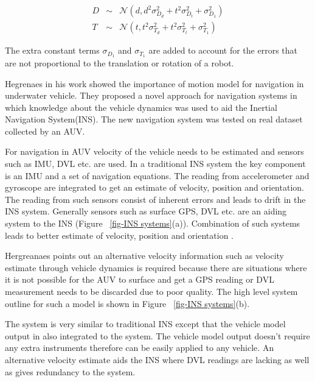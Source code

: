 \documentclass[12pt]{dalcsthesis}
\begin{document}
\begin{equation}
\label{eq-:noise_model_yapp}
\begin{aligned}
D &\sim& \mathcal{{N}}(d,d^2\sigma_{D_{d}}^2+t^2\sigma_{D_{t}}^2+\sigma_{D_{1}}^2) \\
T &\sim& \mathcal{{N}}(t,t^2\sigma_{T_{d}}^2+t^2\sigma_{T_{t}}^2+\sigma_{T_{1}}^2)
\end{aligned}
\end{equation}

The extra constant terms $\sigma_{D_{1}}$ and $\sigma_{T_{1}}$ are added to account for the errors that are not proportional to the translation or rotation of a robot. 

Hegrenaes \cite{Hegrenæs2008} in his work showed the importance of motion model for navigation in underwater vehicle. They proposed a novel approach for navigation systems in which knowledge about the vehicle dynamics was used to aid the Inertial Navigation System(INS). The new navigation system was tested on real dataset collected by an AUV.

For navigation in AUV velocity of the vehicle needs to be estimated and sensors such as IMU, DVL etc. are used. In a traditional INS system the key component is an IMU and a set of navigation equations. The reading from accelerometer and gyroscope are integrated to get an estimate of velocity, position and orientation. The reading from such sensors consist of inherent errors and leads to drift in the INS system. Generally sensors such as surface GPS, DVL etc. are an aiding system to the INS (Figure ~\ref{fig-INS systems}(a)). Combination of such systems leads to better estimate of velocity, position and orientation \cite{leonard1998autonomous}. 

Hergreanaes \cite{Hegrenæs2008} points out an alternative velocity information such as velocity estimate through vehicle dynamics is required because there are situations where it is not possible for the AUV to surface and get a GPS reading or DVL measurement needs to be discarded due to poor quality. The high level system outline for such a model is shown in Figure ~\ref{fig-INS systems}(b).

The system is very similar to traditional INS except that the vehicle model output in also integrated to the system. The vehicle model output doesn't require any extra instruments therefore can be easily applied to any vehicle. An alternative velocity estimate aids the INS where DVL readings are lacking as well as gives redundancy to the system. 
\end{document}
